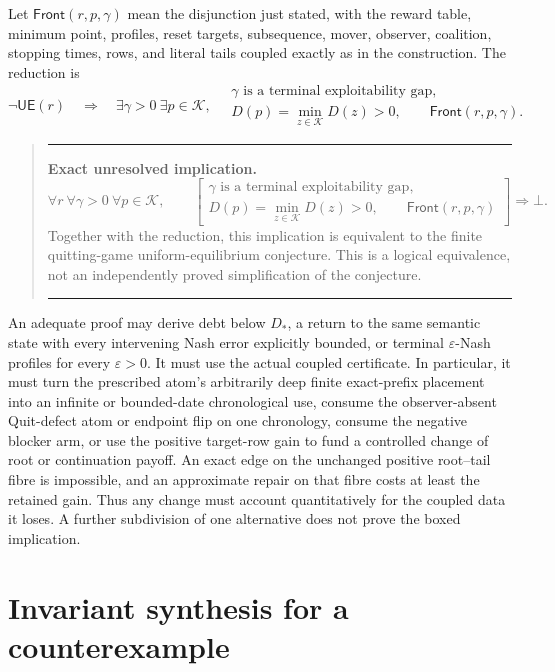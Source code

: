 \documentclass[11pt]{article}
\newcommand{\K}{\mathcal K}
\newcommand{\UE}{\mathsf{UE}}
\newcommand{\Front}{\mathsf{Front}}
\newenvironment{statementbox}[1]
{\def\statementcolor{#1}%
 \par\medskip\begingroup\color{\statementcolor}%
 \begin{quote}\hrule\medskip\color{black}}
{\par\medskip\color{\statementcolor}\hrule\end{quote}%
 \endgroup\par\medskip}
\begin{document}
Let $\Front(r,p,\gamma)$ mean the disjunction just stated, with the reward table,
minimum point, profiles, reset targets, subsequence, mover, observer,
coalition, stopping times, rows, and literal tails coupled exactly as in the
construction.  The reduction is
\[
 \neg\UE(r)\quad\Longrightarrow\quad
 \exists\gamma>0\ \exists p\in\K,\quad
 \begin{gathered}
 \gamma\text{ is a terminal exploitability gap},\\
 D(p)=\min_{z\in\K}D(z)>0,
 \qquad \Front(r,p,\gamma).
 \end{gathered}
\]

\begin{statementbox}{OpenRed}
\textbf{Exact unresolved implication.}
\[
 \boxed{
 \forall r\ \forall\gamma>0\ \forall p\in\K,\qquad
 \left[
 \begin{gathered}
 \gamma\text{ is a terminal exploitability gap},\\
 D(p)=\min_{z\in\K}D(z)>0,
 \qquad \Front(r,p,\gamma)
 \end{gathered}
 \right]
 \Longrightarrow\bot.}
\]
Together with the reduction, this implication is equivalent to
the finite quitting-game uniform-equilibrium conjecture.  This is a logical
equivalence, not an independently proved simplification of the conjecture.
\end{statementbox}

An adequate proof may derive debt below $D_*$, a return to the same semantic
state with every intervening Nash error explicitly bounded, or terminal
$\varepsilon$-Nash profiles for every $\varepsilon>0$.  It must use the
actual coupled certificate.  In particular, it must turn the
prescribed atom's arbitrarily deep finite exact-prefix placement into an
infinite or bounded-date chronological use, consume the observer-absent
Quit-defect atom or endpoint flip on one chronology, consume the negative
blocker arm, or use the positive target-row gain to fund a
controlled change of root or continuation payoff.  An exact edge on the
unchanged positive root--tail fibre is impossible, and an approximate repair
on that fibre costs at least the retained gain.  Thus any change must account
quantitatively for the coupled data it loses.  A further subdivision of one
alternative does not prove the boxed implication.

\section{Invariant synthesis for a counterexample}
\end{document}

